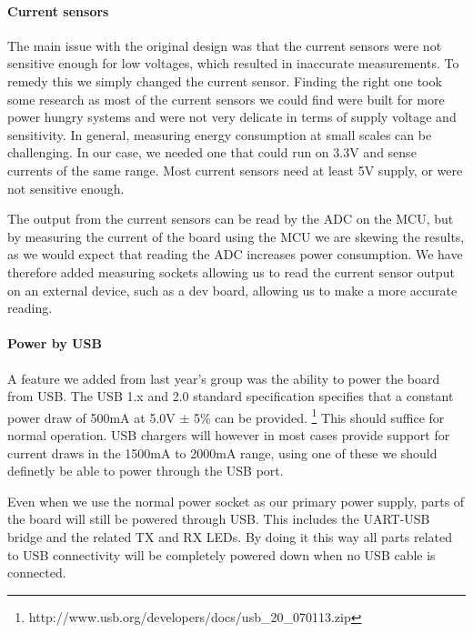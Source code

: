 \paragraph{Current sensors} \label{psu:current_sensors}
The main issue with the original design was that the current sensors were not
sensitive enough for low voltages, which resulted in inaccurate measurements. To
remedy this we simply changed the current sensor. Finding the right one took
some research as most of the current sensors we could find were built for more
power hungry systems and were not very delicate in terms of supply voltage and
sensitivity. In general, measuring energy consumption at small scales 
 can be challenging. 
In our case, we needed one that could run on 3.3V and
sense currents of the same range. Most current sensors need at least 5V supply,
or were not sensitive enough.

The output from the current sensors can be read by the ADC on the MCU, but by
measuring the current of the board using the MCU we are skewing the results, as 
we would expect that reading the ADC increases power consumption. We have 
therefore added measuring sockets allowing us to read the current sensor output
on an external device, such as a dev board, allowing us to make a more accurate
reading.

\paragraph{Power by USB} \label{psu:usb}
A feature we added from last year's group was the ability to power the board
from USB. The USB 1.x and 2.0 standard specification specifies that a constant
power draw of 500mA at 5.0V $\pm$ 5\% can be provided.
\footnote{http://www.usb.org/developers/docs/usb\_20\_070113.zip}
This should suffice for normal operation.
USB chargers will however in most cases provide support for current draws in
the 1500mA to 2000mA range, using one of these we should definetly be able to
power through the USB port.

Even when we use the normal power socket as our primary power supply, parts 
of the board will still be powered through USB. This includes the UART-USB 
bridge and the related TX and RX LEDs. By doing it this way all parts related 
to USB connectivity will be completely powered down when no USB cable is 
connected.